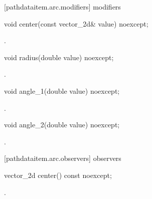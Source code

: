  [pathdataitem.arc.modifiers]{ modifiers}

\begin{itemdecl}
    void center(const vector_2d& value) noexcept;
\end{itemdecl}
\begin{itemdescr}
	\pnum
	\postconditions
	.
	
\end{itemdescr}

\begin{itemdecl}
    void radius(double value) noexcept;
\end{itemdecl}
\begin{itemdescr}
	\pnum
	\postconditions
	.
	
\end{itemdescr}

\begin{itemdecl}
    void angle_1(double value) noexcept;
\end{itemdecl}
\begin{itemdescr}
	\pnum
	\postconditions
	.
	
\end{itemdescr}

\begin{itemdecl}
    void angle_2(double value) noexcept;
\end{itemdecl}
\begin{itemdescr}
	\pnum
	\postconditions
	.
	
\end{itemdescr}

 [pathdataitem.arc.observers]{ observers}

\begin{itemdecl}
    vector_2d center() const noexcept;
\end{itemdecl}
\begin{itemdescr}
	\pnum
	\returns
	.

\end{itemdescr}


